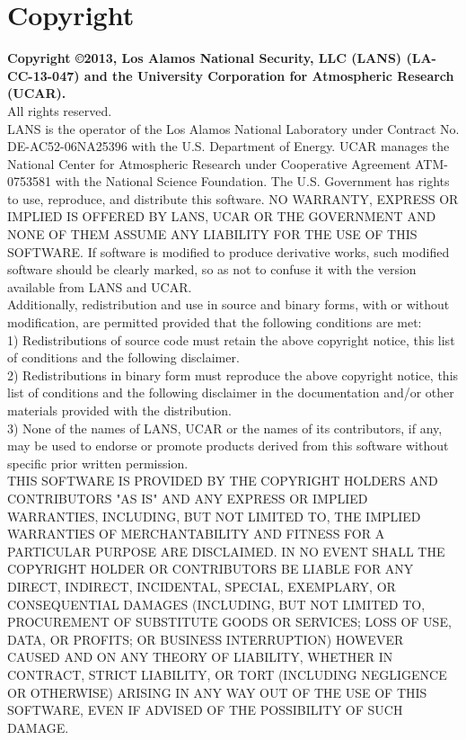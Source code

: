 \chapter*{Copyright}
\label{chap:copyright}
{\bf Copyright \copyright 2013,  Los Alamos National Security, LLC (LANS) (LA-CC-13-047)
and the University Corporation for Atmospheric Research (UCAR).} \\

All rights reserved.  \\

LANS is the operator of the Los Alamos National Laboratory under Contract No.
DE-AC52-06NA25396 with the U.S. Department of Energy.  UCAR manages the National
Center for Atmospheric Research under Cooperative Agreement ATM-0753581 with the
National Science Foundation.  The U.S. Government has rights to use, reproduce,
and distribute this software.  NO WARRANTY, EXPRESS OR IMPLIED IS OFFERED BY
LANS, UCAR OR THE GOVERNMENT AND NONE OF THEM ASSUME ANY LIABILITY FOR THE USE
OF THIS SOFTWARE.  If software is modified to produce derivative works, such
modified software should be clearly marked, so as not to confuse it with the
version available from LANS and UCAR. \\

Additionally, redistribution and use in source and binary forms, with or without
modification, are permitted provided that the following conditions are met: \\

1) Redistributions of source code must retain the above copyright notice, this
list of conditions and the following disclaimer. \\

2) Redistributions in binary form must reproduce the above copyright notice,
this list of conditions and the following disclaimer in the documentation and/or
other materials provided with the distribution. \\

3) None of the names of LANS, UCAR or the names of its contributors, if any, may
be used to endorse or promote products derived from this software without
specific prior written permission. \\

THIS SOFTWARE IS PROVIDED BY THE COPYRIGHT HOLDERS AND CONTRIBUTORS "AS IS" AND
ANY EXPRESS OR IMPLIED WARRANTIES, INCLUDING, BUT NOT LIMITED TO, THE IMPLIED
WARRANTIES OF MERCHANTABILITY AND FITNESS FOR A PARTICULAR PURPOSE ARE
DISCLAIMED. IN NO EVENT SHALL THE COPYRIGHT HOLDER OR CONTRIBUTORS BE LIABLE FOR
ANY DIRECT, INDIRECT, INCIDENTAL, SPECIAL, EXEMPLARY, OR CONSEQUENTIAL DAMAGES
(INCLUDING, BUT NOT LIMITED TO, PROCUREMENT OF SUBSTITUTE GOODS OR SERVICES;
LOSS OF USE, DATA, OR PROFITS; OR BUSINESS INTERRUPTION) HOWEVER CAUSED AND ON
ANY THEORY OF LIABILITY, WHETHER IN CONTRACT, STRICT LIABILITY, OR TORT
(INCLUDING NEGLIGENCE OR OTHERWISE) ARISING IN ANY WAY OUT OF THE USE OF THIS
SOFTWARE, EVEN IF ADVISED OF THE POSSIBILITY OF SUCH DAMAGE.
\newpage

